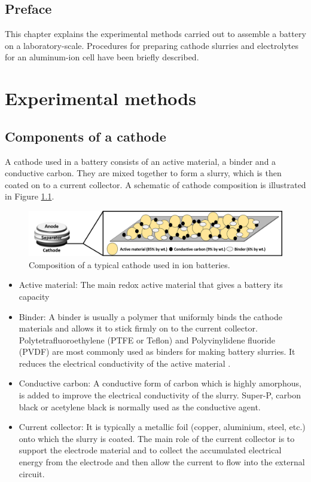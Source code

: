 \section*{\centering Preface}
This chapter explains the experimental methods carried out to assemble a battery on a laboratory-scale. Procedures for preparing cathode slurries and electrolytes for an aluminum-ion cell have been briefly described. 
\pagebreak
\chapter{Experimental methods} %

\label{chap3} %

\section{Components of a cathode}
A cathode used in a battery consists of an active material, a binder and a conductive carbon. They are mixed together to form a slurry, which is then coated on to a current collector. A schematic of cathode composition is illustrated in Figure \ref{Figures/chap3fig:cathodecomp}. 
\begin{figure}[tbh!]
\centering
\includegraphics[width=\textwidth]{Figures/chap3fig/cathodecomp}
\caption{Composition of a typical cathode used in ion batteries.}
\label{Figures/chap3fig:cathodecomp}
\end{figure}

\begin{itemize}
    \item Active material: The main redox active material that gives a battery its capacity
    \item Binder: A binder is usually a polymer that uniformly binds the cathode materials and allows it to stick firmly on to the current collector. Polytetrafluoroethylene (PTFE or Teflon) and Polyvinylidene fluoride (PVDF) are most commonly used as binders for making battery slurries. It reduces the electrical conductivity of the active  material \cite{grillet_conductivity_2016}. 
    \item Conductive carbon: A conductive form of carbon which is highly amorphous, is added to improve the electrical conductivity of the slurry. Super-P, carbon black or acetylene black is normally used as the conductive agent. 
    \item Current collector: It is typically a metallic foil (copper, aluminium, steel, etc.) onto which the slurry is coated. The main role of the current collector is to support the electrode material and to collect the accumulated electrical energy from the electrode and then allow the current to flow into the external circuit\cite{sun_effect_2017}.
\end{itemize}


